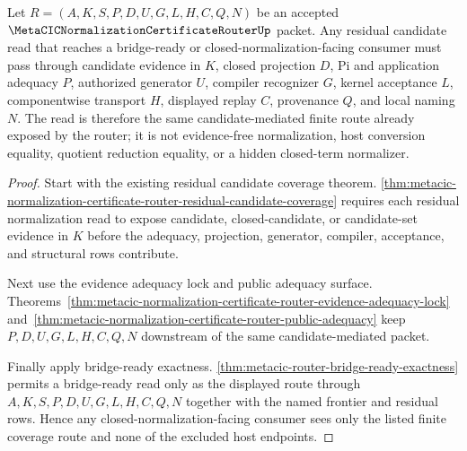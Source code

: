 \begin{theorem}
\label{thm:metacic-normalization-router-residual-candidate-coverage}
Let $R=(A,K,S,P,D,U,G,L,H,C,Q,N)$ be an accepted $\MetaCICNormalizationCertificateRouterUp$ packet. Any residual candidate read that reaches a bridge-ready or closed-normalization-facing consumer must pass through candidate evidence in $K$, closed projection $D$, Pi and application adequacy $P$, authorized generator $U$, compiler recognizer $G$, kernel acceptance $L$, componentwise transport $H$, displayed replay $C$, provenance $Q$, and local naming $N$. The read is therefore the same candidate-mediated finite route already exposed by the router; it is not evidence-free normalization, host conversion equality, quotient reduction equality, or a hidden closed-term normalizer.
\end{theorem}
\begin{proof}
Start with the existing residual candidate coverage theorem. \autoref{thm:metacic-normalization-certificate-router-residual-candidate-coverage} requires each residual normalization read to expose candidate, closed-candidate, or candidate-set evidence in $K$ before the adequacy, projection, generator, compiler, acceptance, and structural rows contribute.

Next use the evidence adequacy lock and public adequacy surface. Theorems~\ref{thm:metacic-normalization-certificate-router-evidence-adequacy-lock} and~\ref{thm:metacic-normalization-certificate-router-public-adequacy} keep $P,D,U,G,L,H,C,Q,N$ downstream of the same candidate-mediated packet.

Finally apply bridge-ready exactness. \autoref{thm:metacic-router-bridge-ready-exactness} permits a bridge-ready read only as the displayed route through $A,K,S,P,D,U,G,L,H,C,Q,N$ together with the named frontier and residual rows. Hence any closed-normalization-facing consumer sees only the listed finite coverage route and none of the excluded host endpoints.
\end{proof}

